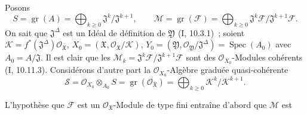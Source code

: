 Posons
\[
S=\operatorname{gr}(A)=\bigoplus_{k\geq0}
\mathfrak J^k/\mathfrak J^{k+1},\qquad
\mathcal M=\operatorname{gr}(\mathcal F)=\bigoplus_{k\geq0}
\mathfrak J^k\mathcal F/\mathfrak J^{k+1}\mathcal F.
\tag{3.4.4.3}\label{III.3.4.4.3-fr}
\]
On sait que $\mathfrak J^\Delta$ est un Idéal de définition de $\mathfrak Y$
(I, 10.3.1)~; soient
$\mathcal K=f^*(\mathfrak J^\Delta)\mathcal O_{\mathfrak X}$,
$X_0=(\mathfrak X,\mathcal O_{\mathfrak X}/\mathcal K)$,
$Y_0=(\mathfrak Y,\mathcal O_{\mathfrak Y}/\mathfrak J^\Delta)
=\operatorname{Spec}(A_0)$ avec $A_0=A/\mathfrak J$. Il est clair que les
$\mathcal M_k=\mathfrak J^k\mathcal F/\mathfrak J^{k+1}\mathcal F$ sont des
$\mathcal O_{X_0}$-Modules cohérents (I, 10.11.3). Considérons d'autre part la
$\mathcal O_{X_0}$-Algèbre graduée quasi-cohérente
\[
\mathcal S=\mathcal O_{X_0}\otimes_{A_0}S
=\operatorname{gr}(\mathcal O_{\mathfrak X})
=\bigoplus_{k\geq0}\mathcal K^k/\mathcal K^{k+1}.
\tag{3.4.4.4}\label{III.3.4.4.4-fr}
\]

L'hypothèse que $\mathcal F$ est un $\mathcal O_{\mathfrak X}$-Module de type
fini entraîne d'abord que $\mathcal M$ est

